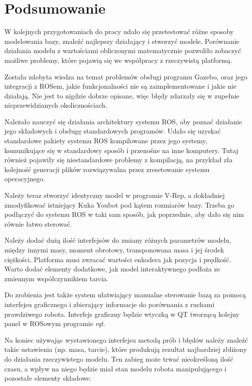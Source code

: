 \section{Podsumowanie}
W kolejnych przygotowaniach do pracy udało się przetestować różne sposoby modelowania bazy, znaleźć najlepszy działający i stworzyć modele.
Porównanie działania modelu z wartościami obliczonymi matematycznie pozwoliło zobaczyć możliwe problemy, które pojawią się we współpracy z rzeczywistą platformą.

Została zdobyta wiedza na temat problemów obsługi programu Gazebo, oraz jego integracji z ROSem, jakie funkcjonalności nie są zaimplementowane i jakie nie działają.
Nie jest to nigdzie dobrze opisane, więc błędy zdarzały się w zupełnie nieprzewidzianych okolicznościach.

Należało nauczyć się działania architektury systemu ROS, aby poznać działanie jego składowych i obsługę standardowych programów.
Udało się uzyskać standardowe pakiety systemu ROS kompilowane przez jego systemy, komunikujące się w standardowy sposób i przenośne na inne komputery.
Tutaj również pojawiły się niestandardowe problemy z kompilacją, na przykład zła kolejność generacji plików rozwiązywalna przez zresetowanie systemu operacyjnego.

Należy teraz stworzyć identyczny model w programie V-Rep, a dokładniej zmodyfikować istniejący Kuka Youbot pod kątem rozmiarów bazy.
Trzeba go podłączyć do systemu ROS w taki sam sposób, jak poprzednie, aby dało się nim równie łatwo sterować.

Należy dodać dużą ilość interfejsów do zmiany różnych parametrów modelu, między innymi masy, moment obrotowy, transponowana masa i jej środek ciężkości.
Platforma musi zwracać wartości enkodera jak pozycja i prędkość.
Warto dodać elementy dodatkowe, jak model interaktywnego podłoża ze zmiennym współczynnikiem tarcia.

Do zrobienia jest także system ułatwiający manualne sterowanie bazą za pomocą interfejsu graficznego i zbierający informacje do porównania z ruchami prawdziwego robota.
Interfejs graficzny będzie wtyczką w QT tworzącą kolejny panel w ROSowym programie \emph{rqt}.

Na koniec używając wystawionego interfejsu metodą prób i błędów należy znaleźć takie ustawienia (np. masa, tarcie), które produkują rezultat najbardziej zbliżony do działania rzeczywistego modelu.
Ten zabieg może trwać nieokreśloną ilość czasu, a wpływ na niego będzie miał stan modelu robota manipulującego i pozostałe elementy składowe.
